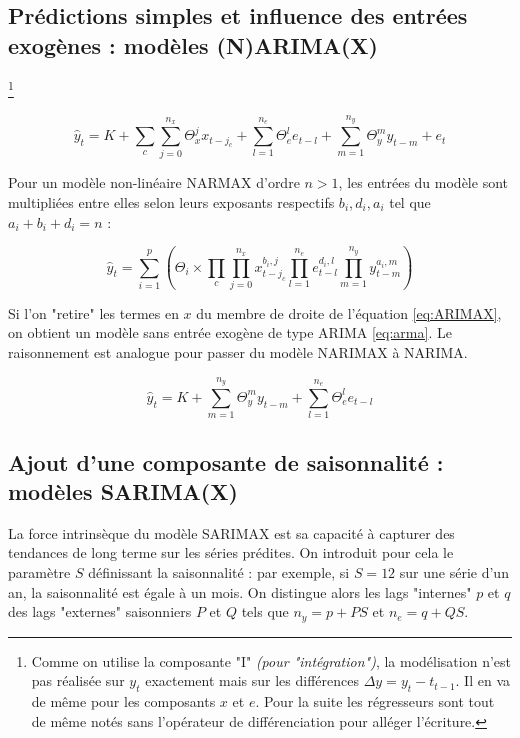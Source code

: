     \subsection{Prédictions simples et influence des entrées exogènes : modèles (N)ARIMA(X)}\label{subsec:modelisations-simples-et-influence-des-entrees-exogenes-:-modeles-arima(x)-et-narima(x)}

        \footnote{Comme on utilise la composante "I" \textit{(pour "intégration")}, la modélisation n'est pas réalisée sur $y_t$ exactement mais sur les différences $\Delta y = y_t-t_{t-1}$. Il en va de même pour les composants $x$ et $e$. Pour la suite les régresseurs sont tout de même notés sans l'opérateur de différenciation pour alléger l'écriture.}

        \begin{equation}
            \hat y_t=K + \sum_{c}\sum_{j=0}^{n_x}\Theta_x^{j}x_{{t-j}_c} + \sum_{l=1}^{n_e}\Theta_e^{l}e_{t-l} + \sum_{m=1}^{n_y}\Theta_{y}^m y_{t-m} + e_t\label{eq:ARIMAX}
        \end{equation}

        Pour un modèle non-linéaire NARMAX d'ordre $n > 1$, les entrées du modèle sont multipliées entre elles selon leurs exposants respectifs $b_i, d_i, a_i$ tel que $a_i + b_i + d_i = n$ :

        \begin{equation}
            \hat y_t=\sum_{i=1}^p\left(\Theta_i \times \prod_c\prod_{j=0}^{n_x}x_{{t-j}_c}^{b_i,j}\prod_{l=1}^{n_e}e_{t-l}^{d_i,l}\prod_{m=1}^{n_y}y_{t-m}^{a_i,m}\right)\label{eq:NARIMAX}
        \end{equation}

        Si l'on "retire" les termes en $x$ du membre de droite de l'équation \ref{eq:ARIMAX}, on obtient un modèle sans entrée exogène de type ARIMA \ref{eq:arma}.
        Le raisonnement est analogue pour passer du modèle NARIMAX à NARIMA\@.

        \begin{equation}
            \hat y_t = K + \sum_{m=1}^{n_y}\Theta_{y}^m y_{t-m} + \sum_{l=1}^{n_e}\Theta_e^{l}e_{t-l} \label{eq:arma}
        \end{equation}
    \subsection{Ajout d'une composante de saisonnalité : modèles SARIMA(X)}\label{subsec:ajout-d'une-composante-saisonniere-:-sarima-sarimax}
        La force intrinsèque du modèle SARIMAX est sa capacité à capturer des tendances de long terme sur les séries prédites.
        On introduit pour cela le paramètre $S$ définissant la saisonnalité : par exemple, si $S=12$ sur une série d'un an, la saisonnalité est égale à un mois.
        On distingue alors les lags "internes" $p$ et $q$ des lags "externes" saisonniers $P$ et $Q$ tels que $n_y = p + PS$ et $n_e = q + QS$.

